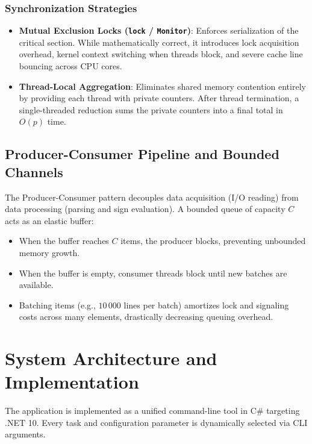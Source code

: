 \documentclass[11pt,a4paper]{article}
\begin{document}
\subsubsection{Synchronization Strategies}
\begin{itemize}
    \item \textbf{Mutual Exclusion Locks (\texttt{lock} / \texttt{Monitor})}: Enforces serialization of the critical section. While mathematically correct, it introduces lock acquisition overhead, kernel context switching when threads block, and severe cache line bouncing across CPU cores.
    \item \textbf{Thread-Local Aggregation}: Eliminates shared memory contention entirely by providing each thread with private counters. After thread termination, a single-threaded reduction sums the private counters into a final total in $O(p)$ time.
\end{itemize}

\subsection{Producer-Consumer Pipeline and Bounded Channels}
The Producer-Consumer pattern decouples data acquisition (I/O reading) from data processing (parsing and sign evaluation). A bounded queue of capacity $C$ acts as an elastic buffer:
\begin{itemize}
    \item When the buffer reaches $C$ items, the producer blocks, preventing unbounded memory growth.
    \item When the buffer is empty, consumer threads block until new batches are available.
    \item Batching items (e.g., $10\,000$ lines per batch) amortizes lock and signaling costs across many elements, drastically decreasing queuing overhead.
\end{itemize}

\section{System Architecture and Implementation}

The application is implemented as a unified command-line tool in C\# targeting .NET 10. Every task and configuration parameter is dynamically selected via CLI arguments.
\end{document}
